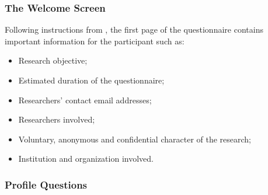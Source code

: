 \subsubsection{The Welcome Screen}

Following instructions from , the first page of the questionnaire contains important information for the participant such as:


\begin{itemize}
  \item Research objective;
  \item Estimated duration of the questionnaire;
  \item Researchers' contact email addresses;
  \item Researchers involved;
  \item Voluntary, anonymous and confidential character of the research;
  \item Institution and organization involved.
\end{itemize}

\subsubsection{Profile Questions}\label{survey:profile-questions}


